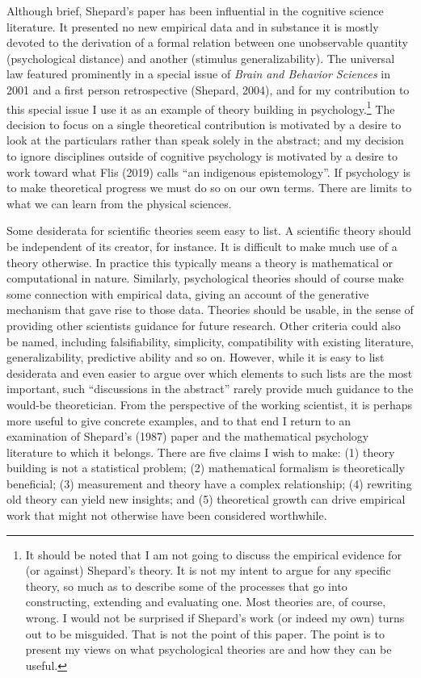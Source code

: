 \documentclass[
  english,
  doc]{apa6}
\begin{document}
Although brief, Shepard's paper has been influential in the cognitive science literature. It presented no new empirical data and in substance it is mostly devoted to the derivation of a formal relation between one unobservable quantity (psychological distance) and another (stimulus generalizability). The universal law featured prominently in a special issue of \emph{Brain and Behavior Sciences} in 2001 and a first person retrospective (Shepard, 2004), and for my contribution to this special issue I use it as an example of theory building in psychology.\footnote{It should be noted that I am not going to discuss the empirical evidence for (or against) Shepard's theory. It is not my intent to argue for any specific theory, so much as to describe some of the processes that go into constructing, extending and evaluating one. Most theories are, of course, wrong. I would not be surprised if Shepard's work (or indeed my own) turns out to be misguided. That is not the point of this paper. The point is to present my views on what psychological theories are and how they can be useful.} The decision to focus on a single theoretical contribution is motivated by a desire to look at the particulars rather than speak solely in the abstract; and my decision to ignore disciplines outside of cognitive psychology is motivated by a desire to work toward what Flis (2019) calls \enquote{an indigenous epistemology}. If psychology is to make theoretical progress we must do so on our own terms. There are limits to what we can learn from the physical sciences.

Some desiderata for scientific theories seem easy to list. A scientific theory should be independent of its creator, for instance. It is difficult to make much use of a theory otherwise. In practice this typically means a theory is mathematical or computational in nature. Similarly, psychological theories should of course make some connection with empirical data, giving an account of the generative mechanism that gave rise to those data. Theories should be usable, in the sense of providing other scientists guidance for future research. Other criteria could also be named, including falsifiability, simplicity, compatibility with existing literature, generalizability, predictive ability and so on. However, while it is easy to list desiderata and even easier to argue over which elements to such lists are the most important, such ``discussions in the abstract'' rarely provide much guidance to the would-be theoretician. From the perspective of the working scientist, it is perhaps more useful to give concrete examples, and to that end I return to an examination of Shepard's (1987) paper and the mathematical psychology literature to which it belongs. There are five claims I wish to make: (1) theory building is not a statistical problem; (2) mathematical formalism is theoretically beneficial; (3) measurement and theory have a complex relationship; (4) rewriting old theory can yield new insights; and (5) theoretical growth can drive empirical work that might not otherwise have been considered worthwhile.
\end{document}
